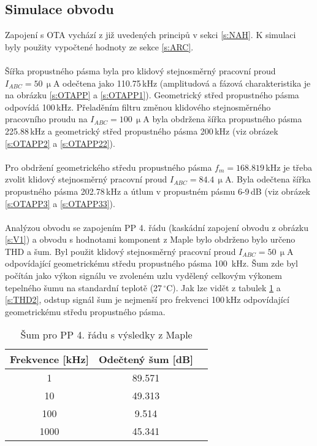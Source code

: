 \subsection{Simulace obvodu}
\noindent  Zapojení s OTA vychází z již uvedených principů v sekci \ref{s:NAH}. K simulaci byly použity vypočtené hodnoty ze sekce \ref{s:ARC}. \\
\\
Šířka propustného pásma byla pro klidový stejnosměrný pracovní proud $I_{ABC} = 50$\,$\upmu$A odečtena jako 110.75\,kHz (amplitudová a fázová charakteristika je na obrázku \ref{s:OTAPP} a \ref{s:OTAPP1}). Geometrický střed propustného pásma odpovídá 100\,kHz. Přeladěním filtru změnou klidového stejnosměrného pracovního proudu na $I_{ABC} = 100$\,$\upmu$A byla obdržena šířka propustného pásma 225.88\,kHz a geometrický střed propustného pásma 200\,kHz (viz obrázek \ref{s:OTAPP2} a \ref{s:OTAPP22}). \\
\\
Pro obdržení geometrického středu propustného pásma $f_m = 168.819$\,kHz je třeba zvolit klidový stejnosměrný pracovní proud $I_{ABC} = 84.4$\,$\upmu$A. Byla odečtena šířka propustného pásma 202.78\,kHz a útlum v propustném pásmu 6-9\,dB (viz obrázek \ref{s:OTAPP3} a \ref{s:OTAPP33}). \\
\\
Analýzou obvodu se zapojením PP 4. řádu (kaskádní zapojení obvodu z obrázku \ref{s:V1}) a obvodu s hodnotami komponent z Maple bylo obdrženo bylo určeno THD a šum. Byl použit klidový stejnosměrný pracovní proud $I_{ABC} = 50$\,$\upmu$A odpovídající geometrickému středu propustného pásma 100~kHz. Šum zde byl počítán jako výkon signálu ve zvoleném uzlu vydělený celkovým výkonem tepelného šumu na standardní teplotě (27\,$^{\circ}$C). Jak lze vidět z tabulek \ref{s:THD1} a \ref{s:THD2}, odstup signál šum je nejmenší pro frekvenci 100\,kHz odpovídající geometrickému středu propustného pásma.
\begin{table}[h]
\centering
  \begin{tabular}{ | c | c | c |}
    \hline
     Frekvence [kHz] & Odečtený šum [dB] \\ \hline
    1 & 89.571 \\ \hline
    10 & 49.313 \\ \hline
    100 & 9.514 \\ \hline
    1000 & 45.341 \\ \hline
  \end{tabular}
  \caption[Šum pro PP 4. řádu (Maple)]{Šum pro PP 4. řádu s výsledky z Maple \label{s:THD1}}
\end{table}

